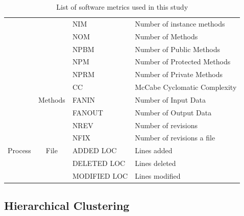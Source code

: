 \documentclass[10pt,journal,compsoc]{IEEEtran}
\begin{document}
\begin{table}[!t]
\begin{tabular}{|p{1cm}|c|l|p{3cm}|}
                                  &                                   & NIM         & Number of instance methods     \\ \cline{3-4} 
                                  &                                   & NOM         & Number of Methods              \\ \cline{3-4} 
                                  &                                   & NPBM        & Number of Public Methods       \\ \cline{3-4} 
                                  &                                   & NPM         & Number of Protected Methods    \\ \cline{3-4} 
                                  &                                   & NPRM        & Number of Private Methods      \\ \cline{2-4} 
                                  & \multirow{3}{*}{Methods}          & CC          & McCabe Cyclomatic Complexity   \\ \cline{3-4} 
                                  &                                   & FANIN       & Number of Input Data           \\ \cline{3-4} 
                                  &                                   & FANOUT      & Number of Output Data          \\ \hline
\multirow{5}{*}{Process }  & \multirow{5}{*}{File}             & NREV        & Number of revisions            \\ \cline{3-4} 
                                  &                                   & NFIX        & Number of revisions a file     \\ \cline{3-4} 
                                  &                                   & ADDED LOC    & Lines added                    \\ \cline{3-4} 
                                  &                                   & DELETED LOC  & Lines deleted                  \\ \cline{3-4} 
                                  &                                   & MODIFIED LOC & Lines modified                 \\ \hline
\end{tabular}
\caption{List of software metrics used in this study}
\label{tbl:metric}
\end{table}
\subsection{Hierarchical Clustering}\label{sec:hc}
\end{document}
